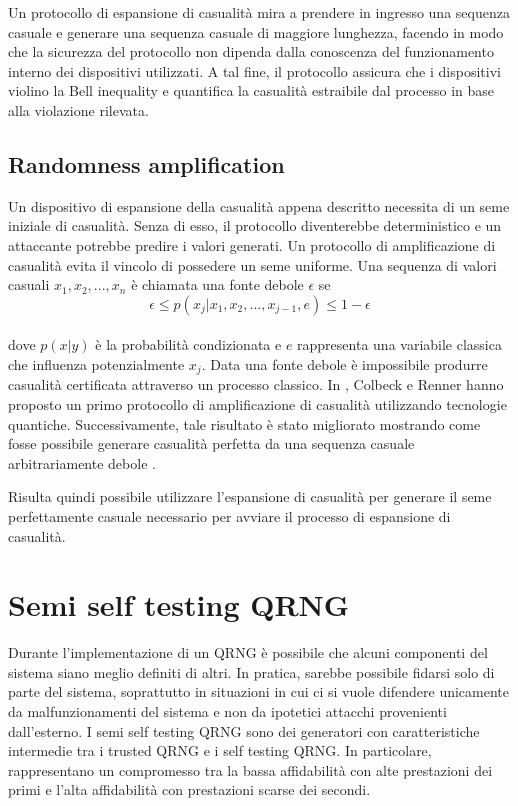 Un protocollo di espansione di casualità mira a prendere in ingresso una sequenza casuale e generare una sequenza casuale di maggiore lunghezza, facendo in modo che la sicurezza del protocollo non dipenda dalla conoscenza del funzionamento interno dei dispositivi utilizzati. A tal fine, il protocollo assicura che i dispositivi violino la Bell inequality e quantifica la casualità estraibile dal processo in base alla violazione rilevata.

\subsection{Randomness amplification}
Un dispositivo di espansione della casualità appena descritto necessita di un seme iniziale di casualità. Senza di esso, il protocollo diventerebbe deterministico e un attaccante potrebbe predire i valori generati. Un protocollo di amplificazione di casualità evita il vincolo di possedere un seme uniforme. Una sequenza di valori casuali $x_1,x_2,...,x_n$ è chiamata una fonte debole $\epsilon$ se
\\
\[\epsilon\leq p(x_j|x_1,x_2,...,x_{j-1},e)\leq1-\epsilon\]
\\
dove $p(x|y)$ è la probabilità condizionata e $e$ rappresenta una variabile classica che influenza potenzialmente $x_j$. Data una fonte debole è impossibile produrre casualità certificata attraverso un processo classico. In \cite{noauthor_free_nodate}, Colbeck e Renner hanno proposto un primo protocollo di amplificazione di casualità utilizzando tecnologie quantiche. Successivamente, tale risultato è stato migliorato mostrando come fosse possibile generare casualità perfetta da una sequenza casuale arbitrariamente debole \cite{gallego_full_2013}.

Risulta quindi possibile utilizzare l'espansione di casualità per generare il seme perfettamente casuale necessario per avviare il processo di espansione di casualità. 

\section{Semi self testing QRNG}
Durante l'implementazione di un QRNG è possibile che alcuni componenti del sistema siano meglio definiti di altri. In pratica, sarebbe possibile fidarsi solo di parte del sistema, soprattutto in situazioni in cui ci si vuole difendere unicamente da malfunzionamenti del sistema e non da ipotetici attacchi provenienti dall'esterno. I semi self testing QRNG sono dei generatori con caratteristiche intermedie tra i trusted QRNG e i self testing QRNG. In particolare, rappresentano un compromesso tra la bassa affidabilità con alte prestazioni dei primi e l'alta affidabilità con prestazioni scarse dei secondi.

